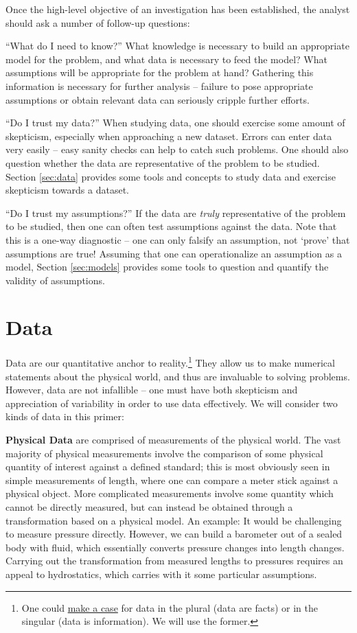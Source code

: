 \documentclass[../primer.tex]{subfiles}
\begin{document}
Once the high-level objective of an investigation has been established, the
analyst should ask a number of follow-up questions:

``What do I need to know?'' What knowledge is necessary to build an appropriate
model for the problem, and what data is necessary to feed the model? What
assumptions will be appropriate for the problem at hand? Gathering this
information is necessary for further analysis -- failure to pose appropriate
assumptions or obtain relevant data can seriously cripple further efforts.

``Do I trust my data?'' When studying data, one should exercise some amount of
skepticism, especially when approaching a new dataset. Errors can enter data
very easily -- easy sanity checks can help to catch such problems. One should
also question whether the data are representative of the problem to be studied.
Section \ref{sec:data} provides some tools and concepts to study data and
exercise skepticism towards a dataset.

``Do I trust my assumptions?'' If the data are \emph{truly} representative of
the problem to be studied, then one can often test assumptions against the data.
Note that this is a one-way diagnostic -- one can only falsify an assumption,
not `prove' that assumptions are true! Assuming that one can operationalize an
assumption as a model, Section \ref{sec:models} provides some tools to question
and quantify the validity of assumptions.

\section{Data} \label{sec:ch3-data}
Data are our quantitative anchor to reality.\footnote{One could
  \href{http://phdcomics.com/comics.php?f=1816}{make a case} for data in the
  plural (data are facts) or in the singular (data is information). We will use
  the former.} They allow us to make numerical statements about the physical
world, and thus are invaluable to solving problems. However, data are not
infallible -- one must have both skepticism and appreciation of variability in
order to use data effectively. We will consider two kinds of data in this
primer:

\textbf{Physical Data} are comprised of measurements of the physical world. The
vast majority of physical measurements involve the comparison of some physical
quantity of interest against a defined standard; this is most obviously seen in
simple measurements of length, where one can compare a meter stick against a
physical object. More complicated measurements involve some quantity which
cannot be directly measured, but can instead be obtained through a
transformation based on a physical model. An example: It would be challenging to
measure pressure directly. However, we can build a barometer out of a sealed
body with fluid, which essentially converts pressure changes into length
changes. Carrying out the transformation from measured lengths to pressures
requires an appeal to hydrostatics, which carries with it some particular
assumptions.
\end{document}
